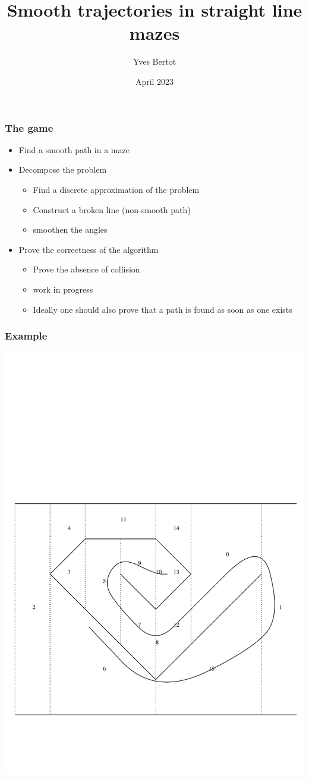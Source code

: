 \documentclass[compress]{beamer}
\title{Smooth trajectories in straight line mazes}
\author{Yves Bertot}
\date{April 2023}
\begin{document}
\maketitle
\begin{frame}
\frametitle{The game}
\begin{itemize}
\item Find a smooth path in a maze
\item Decompose the problem
\begin{itemize}
\item Find a discrete approximation of the problem
\item Construct a broken line (non-smooth path)
\item smoothen the angles
\end{itemize}
\item Prove the correctness of the algorithm
\begin{itemize}
\item Prove the absence of collision
\item work in progress
\item Ideally one should also prove that a path
is found as soon as one exists
\end{itemize}
\end{itemize}
\end{frame}
\begin{frame}
\frametitle{Example}
\includegraphics[trim={0 0 0 10cm}, clip, width=\textwidth]{spiral.pdf}
\end{frame}
\end{document}
